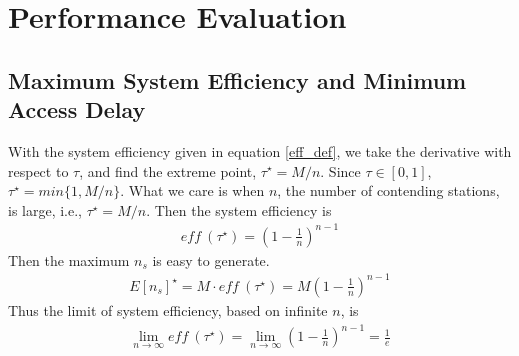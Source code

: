 \chapter{Performance Evaluation} \label{chp_perf_eval}
\section{Maximum System Efficiency and Minimum Access Delay} 	\label{sec_max_min}
With the system efficiency given in equation \ref{eff_def}, we take the derivative with respect to $\tau$, and find the extreme point, $\tau^\star = M/n$. Since $\tau\in [0,1]$, $\tau^\star = min\lbrace 1,M/n\rbrace$. 
What we care is when $n$, the number of contending stations, is large, i.e., $\tau^\star = M/n$. 
Then the system efficiency is
\begin{align}
\textit{eff}\ (\tau^\star) = (1-\frac{1}{n})^{n-1} 
\label{equ_max_eff}
\end{align}
Then the maximum $n_s$ is easy to generate.
\begin{align}
\label{equ_max_ns}
E[n_s]^\star = M \cdot \textit{eff}\ (\tau^\star) = M(1-\frac{1}{n})^{n-1} 
\end{align}
Thus the limit of system efficiency, based on infinite $n$, is
\begin{align}
\label{eff_limit}
\lim_{n\rightarrow \infty}\textit{eff}\ (\tau^\star) = \lim_{n\rightarrow \infty}(1-\frac{1}{n})^{n-1} =\frac{1}{e} 
\end{align}

